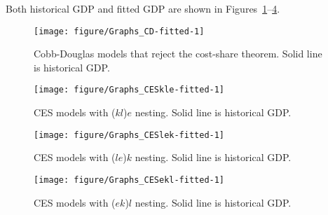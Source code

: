 \documentclass[preprint,authoryear,12pt]{elsarticle}\usepackage[]{graphicx}\usepackage[]{color}
\makeatletter
\def\maxwidth{ %
  \ifdim\Gin@nat@width>\linewidth
    \linewidth
  \else
    \Gin@nat@width
  \fi
}
\newenvironment{knitrout}{}{} %
\makeatother
\begin{document}
Both historical GDP and fitted GDP are shown in 
Figures~\ref{fig:Graphs CD-fitted}--\ref{fig:Graphs CESekl-fitted}.
%
\begin{knitrout}
\color{fgcolor}\begin{figure}[H]

{\centering \texttt{[image: figure/Graphs\_CD-fitted-1]} 

}

\caption[Cobb-Douglas models that reject the cost-share theorem]{Cobb-Douglas models that reject the cost-share theorem. Solid line is historical GDP.}\label{fig:Graphs CD-fitted}
\end{figure}


\end{knitrout}
%
\begin{knitrout}
\color{fgcolor}\begin{figure}[H]

{\centering \texttt{[image: figure/Graphs\_CESkle-fitted-1]} 

}

\caption[CES models with (]{CES models with ($kl$)$e$ nesting. Solid line is historical GDP.}\label{fig:Graphs CESkle-fitted}
\end{figure}


\end{knitrout}
%
\begin{knitrout}
\color{fgcolor}\begin{figure}[H]

{\centering \texttt{[image: figure/Graphs\_CESlek-fitted-1]} 

}

\caption[CES models with (]{CES models with ($le$)$k$ nesting. Solid line is historical GDP.}\label{fig:Graphs CESlek-fitted}
\end{figure}


\end{knitrout}
%
\begin{knitrout}
\color{fgcolor}\begin{figure}[H]

{\centering \texttt{[image: figure/Graphs\_CESekl-fitted-1]} 

}

\caption[CES models with (]{CES models with ($ek$)$l$ nesting. Solid line is historical GDP.}\label{fig:Graphs CESekl-fitted}
\end{figure}


\end{knitrout}
\end{document}
